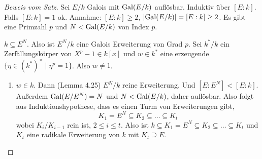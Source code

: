 \begin{proof}[Beweis vom Satz]
	Sei $E / k$ Galois mit $\operatorname{Gal}(E / k)$ auflösbar. 
	Induktiv über $[E:k]$. Falls $[E:k] = 1$ ok.
	Annahme: $[E:k] \geq 2$, $\abs{\operatorname{Gal}(E / k)} = [E:k] \geq 2$.
	Es gibt eine Primzahl $p$ und $N \vartriangleleft \operatorname{Gal}(E / k)$ von Index $p$.

	$k \subseteq E^{N}$. Also ist $E^{N} / k$ eine Galois Erweiterung von Grad $p$.
	Sei $k^{*} / k$ ein Zerfällungskörper von $X^{p}-1 \in k[x]$ und $w \in k^{*}$ eine erzeugende $\{\eta \in (k^{*})^{\times} \mid \eta^{p} = 1\}$. Also $w \neq 1$.

	\begin{enumerate}[{Fall} 1]
		\item $w \in k$. Dann (Lemma 4.25) $E^{N} / k$ reine Erweiterung. Und $[E:E^{N}] < [E:k]$.
			Außerdem $\operatorname{Gal}(E / E^{N}) = N$ und $N < \operatorname{Gal}(E / k)$, daher auflösbar.
			Also folgt aus Induktionshypothese, dass es einen Turm von Erweiterungen gibt,
			\[
			K_1 = E^{N} \subseteq K_2 \subseteq \ldots \subseteq K_{t}
			\] 
			wobei $K_{i} / K_{i-1}$ rein ist, $2 \leq i \leq t$.
			Also ist $k \subseteq K_1 = E^{N} \subseteq K_2 \subseteq \ldots \subseteq K_{t}$ und $K_{t}$ eine radikale Erweiterung von $k$ mit $K_{t} \supseteq E$.

	\end{enumerate}
\end{proof}



































